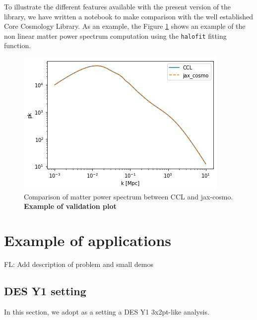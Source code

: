 \documentclass[final,5p,times,twocolumn,authoryear]{elsarticle}
\newcommand{\nblink}[1]{\href{https://github.com/DifferentiableUniverseInitiative/jax-cosmo-paper/blob/master/notebooks/#1.ipynb}{\faFileCodeO}}
\newcommand{\FL}[1]{{\color{cyan}FL: #1}}
\begin{document}
%
To illustrate the different features available with the present version of the library, we have written a  notebook to make  comparison with the well established  Core Cosmology Library. As an example, the Figure \ref{fig:halofit_comparison} shows an example of the non linear matter power spectrum computation using the \texttt{halofit} fitting function. 
%
\begin{figure}[ht]
    \centering
    \includegraphics[width=\columnwidth]{figures/halofit_pk.png}
    \caption{Comparison of matter power spectrum between CCL and jax-cosmo. \textbf{Example of validation plot} \nblink{CCL_comparison}}
    \label{fig:halofit_comparison}
\end{figure}



\section{Example of applications}

\FL{Add description of problem and small demos}

\subsection{DES Y1 setting}
 
In this section, we adopt as a setting a DES Y1 3x2pt-like analysis. 
\end{document}
